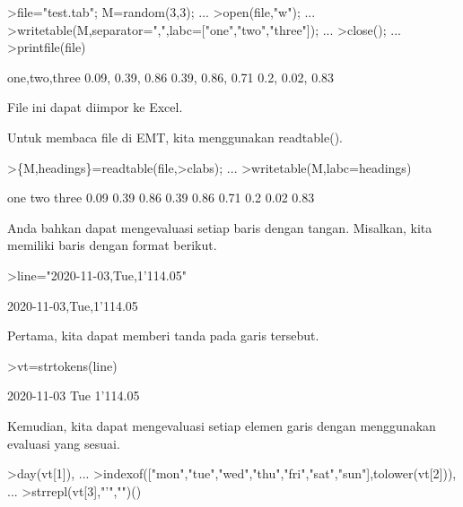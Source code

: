 \documentclass[12pt,arial,letterpaper]{book}
\begin{document}
\begin{eulernootebook}
\begin{eulercomment}
\begin{eulercomment}
\begin{eulernootebook}
\begin{eulercomment}
\begin{eulercomment}
\begin{eulercomment}
\begin{eulercomment}
\begin{eulercomment}
\begin{eulercomment}
\begin{eulercomment}
\begin{eulercomment}
\begin{eulercomment}
\begin{eulercomment}
\begin{eulercomment}
\begin{eulercomment}
\begin{eulercomment}
\begin{eulerprompt}
>file="test.tab"; M=random(3,3);  ...
>open(file,"w");  ...
>writetable(M,separator=",",labc=["one","two","three"]);  ...
>close(); ...
>printfile(file)
\end{eulerprompt}
\begin{euleroutput}
  one,two,three
        0.09,      0.39,      0.86
        0.39,      0.86,      0.71
         0.2,      0.02,      0.83
\end{euleroutput}
\begin{eulercomment}
File ini dapat diimpor ke Excel.

Untuk membaca file di EMT, kita menggunakan readtable().
\end{eulercomment}
\begin{eulerprompt}
>\{M,headings\}=readtable(file,>clabs); ...
>writetable(M,labc=headings)
\end{eulerprompt}
\begin{euleroutput}
         one       two     three
        0.09      0.39      0.86
        0.39      0.86      0.71
         0.2      0.02      0.83
\end{euleroutput}
\begin{eulercomment}
Anda bahkan dapat mengevaluasi setiap baris dengan tangan. Misalkan,
kita memiliki baris dengan format berikut.
\end{eulercomment}
\begin{eulerprompt}
>line="2020-11-03,Tue,1'114.05"
\end{eulerprompt}
\begin{euleroutput}
  2020-11-03,Tue,1'114.05
\end{euleroutput}
\begin{eulercomment}
Pertama, kita dapat memberi tanda pada garis tersebut.
\end{eulercomment}
\begin{eulerprompt}
>vt=strtokens(line)
\end{eulerprompt}
\begin{euleroutput}
  2020-11-03
  Tue
  1'114.05
\end{euleroutput}
\begin{eulercomment}
Kemudian, kita dapat mengevaluasi setiap elemen garis dengan
menggunakan evaluasi yang sesuai.
\end{eulercomment}
\begin{eulerprompt}
>day(vt[1]),  ...
>indexof(["mon","tue","wed","thu","fri","sat","sun"],tolower(vt[2])),  ...
>strrepl(vt[3],"'","")()

\end{eulerprompt}
\end{eulercomment}
\end{eulercomment}
\end{eulercomment}
\end{eulercomment}
\end{eulercomment}
\end{eulercomment}
\end{eulercomment}
\end{eulercomment}
\end{eulercomment}
\end{eulercomment}
\end{eulercomment}
\end{eulercomment}
\end{eulercomment}
\end{eulernootebook}
\end{eulercomment}
\end{eulercomment}
\end{eulernootebook}
\end{document}
